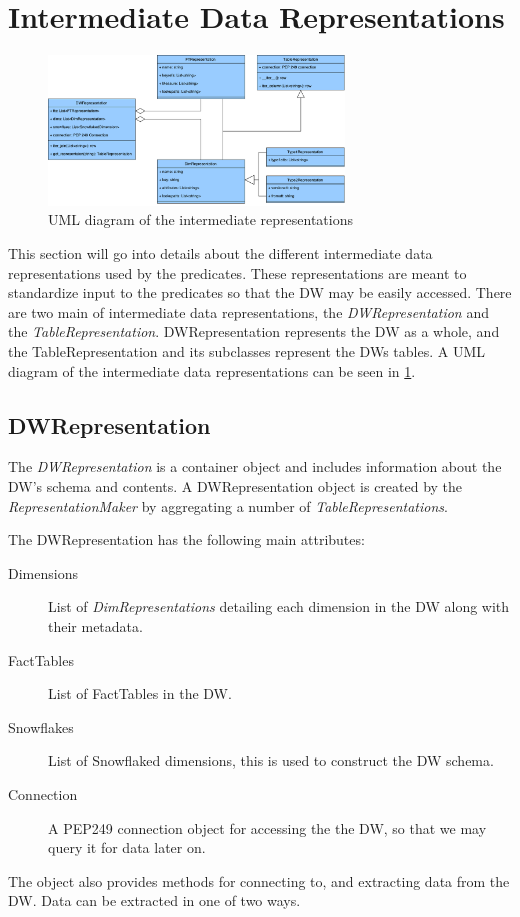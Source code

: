 \section{Intermediate Data Representations}
\begin{figure}
\centering
\includegraphics[width=0.7\textwidth]{figures/dwrep_uml.pdf}
\caption{UML diagram of the intermediate representations}
\label{fig:dwrep}
\end{figure}

This section will go into details about the different intermediate data representations used by the predicates. These representations are meant to standardize input to the predicates so that the DW may be easily accessed. There are two main of intermediate data representations, the \textit{DWRepresentation} and the \textit{TableRepresentation}. DWRepresentation represents the DW as a whole, and the TableRepresentation and its subclasses represent the DWs tables. A UML diagram of the intermediate data representations can be seen in \cref{fig:dwrep}.

\subsection{DWRepresentation}
The \textit{DWRepresentation} is a container object and includes information about the DW's schema and contents. A DWRepresentation object is created by the \textit{RepresentationMaker} by aggregating a number of \textit{TableRepresentations}.

The DWRepresentation has the following main attributes:

\begin{description}
\item[Dimensions] List of \textit{DimRepresentations} detailing each dimension in the DW along with their metadata.
\item[FactTables] List of FactTables in the DW.
\item[Snowflakes] List of Snowflaked dimensions, this is used to construct the DW schema.
\item[Connection] A PEP249 connection object for accessing the the DW, so that we may query it for data later on.
\end{description}
The object also provides methods for connecting to, and extracting data from the DW. Data can be extracted in one of two ways. 

